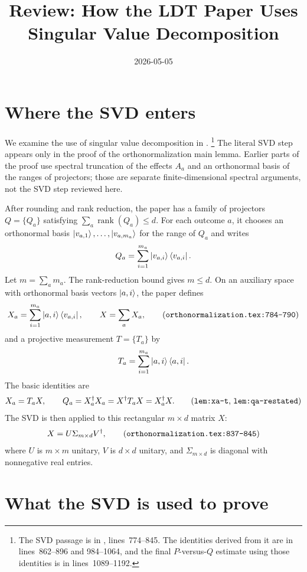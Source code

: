 \documentclass[11pt]{article}
\title{Review: How the LDT Paper Uses Singular Value Decomposition}
\author{}
\date{2026-05-05}
\begin{document}
\maketitle

\section{Where the SVD enters}

We examine the use of singular value decomposition in
\cite[Section~``Orthonormalization'']{Ji2020LowIndividualDegree}.%
\footnote{The SVD passage is in
, lines~774--845.  The
identities derived from it are in lines~862--896 and 984--1064, and the final
$P$-versus-$Q$ estimate using those identities is in lines~1089--1192.}
The literal SVD step appears only in the proof of the orthonormalization main
lemma.  Earlier parts of the proof use spectral truncation of the effects
$A_a$ and an orthonormal basis of the ranges of projectors; those are separate
finite-dimensional spectral arguments, not the SVD step reviewed here.

After rounding and rank reduction, the paper has a family of projectors
$Q=\{Q_a\}$ satisfying $\sum_a \operatorname{rank}(Q_a)\le d$.  For each
outcome $a$, it chooses an orthonormal basis
$\ket{v_{a,1}},\ldots,\ket{v_{a,m_a}}$ for the range of $Q_a$ and writes
\[
  Q_a = \sum_{i=1}^{m_a} \ket{v_{a,i}}\bra{v_{a,i}}.
\]
Let $m=\sum_a m_a$.  The rank-reduction bound gives $m\le d$.  On an auxiliary
space with orthonormal basis vectors $\ket{a,i}$, the paper defines
\[
  X_a = \sum_{i=1}^{m_a} \ket{a,i}\bra{v_{a,i}},
  \qquad
  X = \sum_a X_a,
  \tag{\texttt{orthonormalization.tex:784--790}}
\]
and a projective measurement $T=\{T_a\}$ by
\[
  T_a = \sum_{i=1}^{m_a}\ket{a,i}\bra{a,i}.
\]
The basic identities are
\[
  X_a = T_a X,
  \qquad
  Q_a = X_a^\dagger X_a = X^\dagger T_a X = X_a^\dagger X.
  \tag{\texttt{lem:xa-t}, \texttt{lem:qa-restated}}
\]
The SVD is then applied to this rectangular $m\times d$ matrix $X$:
\[
  X = U\Sigma_{m\times d}V^\dagger,
  \tag{\texttt{orthonormalization.tex:837--845}}
\]
where $U$ is $m\times m$ unitary, $V$ is $d\times d$ unitary, and
$\Sigma_{m\times d}$ is diagonal with nonnegative real entries.

\section{What the SVD is used to prove}
\end{document}
